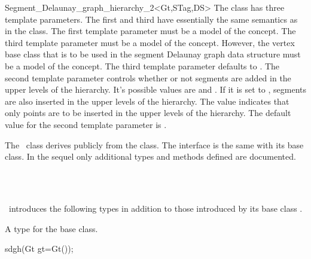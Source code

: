 \begin{ccRefClass}{Segment_Delaunay_graph_hierarchy_2<Gt,STag,DS>}
The class has three template parameters. The first and third
have essentially the same semantics as in the
 class. The
first template parameter must be a model of the
 concept. The third template
parameter must be a model of the
 concept. However, the
vertex base class that is to be used in the segment Delaunay graph
data structure must be a model of the
concept. The third template parameter defaults to
. The second template
parameter controls whether or not segments are added in the upper
levels of the hierarchy. It's possible values are 
and . If it is set to ,
segments are also inserted in the upper levels of the hierarchy. The
value  indicates that only points are to be
inserted in the upper levels of the hierarchy. The default value for
the second template parameter is .


The \ccRefName\ class derives publicly from the
 class. The interface is
the same with its base class. In the sequel only additional types
and methods defined are documented.




\ccIsModel
{}\\
\\

\ccInheritsFrom
{}


\ccTypes
\ccRefName\ introduces the following types in addition to those
introduced by its base class .

\ccThreeToTwo
{}
\ccGlue
{}
          {A type for the base class.}

\ccCreation
{}
%
{sdgh(Gt gt=Gt());}{}
\ccThreeToTwo
{}


\end{ccRefClass}
